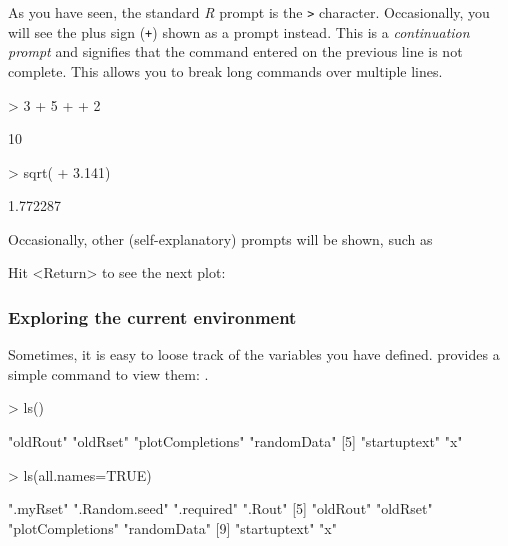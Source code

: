 \documentclass[10pt,letterpaper]{article}
\begin{document}
As you have seen, the standard \emph{R} prompt is the \texttt{>} character.  Occasionally, you will see the plus sign (\texttt{+}) shown as a prompt instead.  This is a \emph{continuation prompt} and signifies that the command entered on the previous line is not complete.  This allows you to break long commands over multiple lines.

\begin{Schunk}
\begin{Sinput}
> 3 + 5 +
+ 2
\end{Sinput}
\begin{Soutput}
[1] 10
\end{Soutput}
\begin{Sinput}
> sqrt(
+   3.141)
\end{Sinput}
\begin{Soutput}
[1] 1.772287
\end{Soutput}
\end{Schunk}

Occasionally, other (self-explanatory) prompts will be shown, such as
\begin{Schunk}
\begin{Soutput}
Hit <Return> to see the next plot: 
\end{Soutput}
\end{Schunk}

\subsubsection{Exploring the current environment} %
\label{ssub:exploring_the_current_environment}

Sometimes, it is easy to loose track of the variables you have defined.  \R provides a simple command to view them: .

\begin{Schunk}
\begin{Sinput}
> ls()
\end{Sinput}
\begin{Soutput}
[1] "oldRout"         "oldRset"         "plotCompletions" "randomData"     
[5] "startuptext"     "x"              
\end{Soutput}
\begin{Sinput}
> ls(all.names=TRUE)
\end{Sinput}
\begin{Soutput}
 [1] ".myRset"         ".Random.seed"    ".required"       ".Rout"          
 [5] "oldRout"         "oldRset"         "plotCompletions" "randomData"     
 [9] "startuptext"     "x"              
\end{Soutput}
\end{Schunk}
\end{document}
